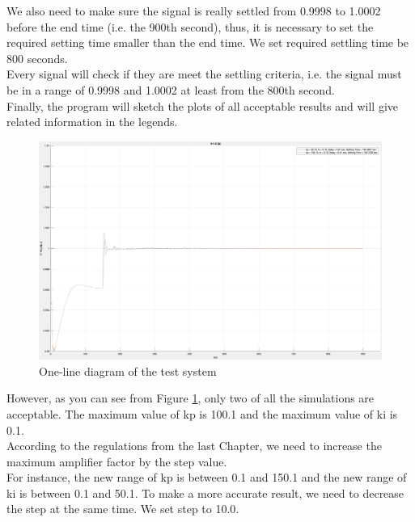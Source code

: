 \documentclass{report}
\begin{document}
We also need to make sure the signal is really settled from 0.9998 to 1.0002 before the end time (i.e. the 900th second), thus, it is necessary to set the required setting time smaller than the end time. We set required settling time be 800 seconds. \\

Every signal will check if they are meet the settling criteria, i.e. the signal must be in a range of 0.9998 and 1.0002 at least from the 800th second.\\

Finally, the program will sketch the plots of all acceptable results and will give related information in the legends. \\

\begin{figure}[htbp]
\centering
\includegraphics[width = \textwidth]{figure/4_1_1_a.jpeg}
\caption{One-line diagram of the test system}
\label{4_1_1_a}
\end{figure}

However, as you can see from Figure \textcolor{red}{\ref{4_1_1_a}}, only two of all the simulations are acceptable. The maximum value of kp is 100.1 and the maximum value of ki is 0.1. \\

According to the regulations from the last Chapter, we need to increase the maximum amplifier factor by the step value. \\

For instance, the new range of kp is between 0.1 and 150.1 and the new range of ki is between 0.1 and 50.1. To make a more accurate result, we need to decrease the step at the same time. We set step to 10.0. \\
\end{document}
